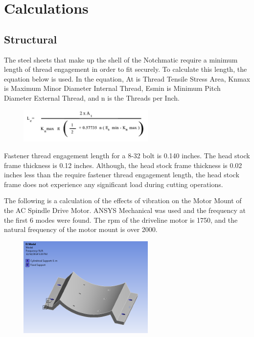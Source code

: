 \chapter{Calculations}

\section{Structural}

The steel sheets that make up the shell of the Notchmatic require a minimum length of thread engagement in order to fit securely. To calculate this length, the equation below is used. In the equation, At is Thread Tensile Stress Area, Knmax is Maximum Minor Diameter Internal Thread, Esmin is Minimum Pitch Diameter External Thread, and n is the Threads per Inch. 

\begin{figure}[H]
    \centering
    \includegraphics[width=0.6\textwidth]{./fall-report pictures/Chapter3-Calculations/ShellThread}
    \label{fig:ThreadEng}
\end{figure}

Fastener thread engagement length for a 8-32 bolt is 0.140 inches. The head stock frame thickness is 0.12 inches. Although, the head stock frame thickness is 0.02 inches less than the require fastener thread engagement length, the head stock frame does not experience any significant load during cutting operations. 

\newpage

The following is a calculation of the effects of vibration on the Motor Mount of the AC Spindle Drive Motor. ANSYS Mechanical was used and the frequency at the first 6 modes were found. The rpm of the driveline motor is 1750, and the natural frequency of the motor mount is over 2000.

\begin{figure}[H]
    \centering
    \includegraphics[width=0.6\textwidth]{./fall-report pictures/Chapter3-Calculations/AnsysMotorMount}
    \label{fig:MM1}
\end{figure}


